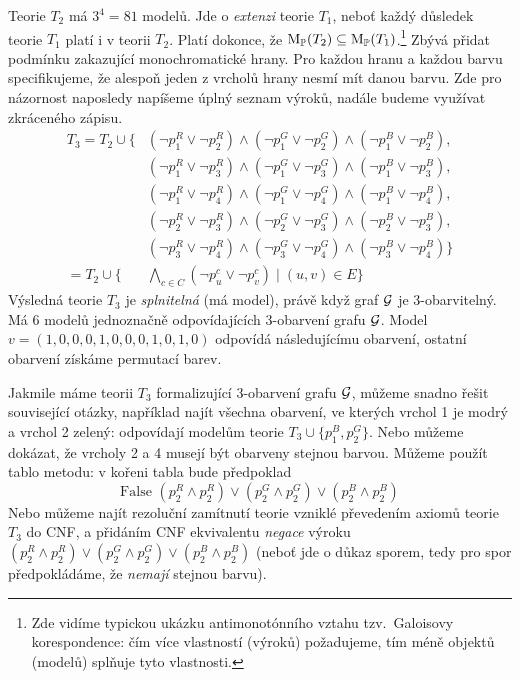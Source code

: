 Teorie \( T_2 \) má \(3^4=81\) modelů. Jde o \emph{extenzi} teorie \( T_1 \), neboť každý důsledek teorie \( T_1 \) platí i v teorii \( T_2 \). Platí dokonce, že \( \operatorname{M}_\mathbb P(T_2)\subseteq\operatorname{M}_\mathbb P(T_1) \).\footnote{Zde vidíme typickou ukázku antimonotónního vztahu tzv.\ Galoisovy korespondence: čím více vlastností (výroků) požadujeme, tím méně objektů (modelů) splňuje tyto vlastnosti.} Zbývá přidat podmínku zakazující monochromatické hrany. Pro každou hranu a každou barvu specifikujeme, že alespoň jeden z vrcholů hrany nesmí mít danou barvu. Zde pro názornost naposledy napíšeme úplný seznam výroků, nadále budeme využívat zkráceného zápisu.
\begin{align*}
    T_3 = T_2\cup \{ & (\neg p_1^R \lor \neg p_2^R) \land (\neg p_1^G \lor \neg p_2^G) \land (\neg p_1^B \lor \neg p_2^B),\\
    & (\neg p_1^R \lor \neg p_3^R) \land (\neg p_1^G \lor \neg p_3^G) \land (\neg p_1^B \lor \neg p_3^B),\\
    & (\neg p_1^R \lor \neg p_4^R) \land (\neg p_1^G \lor \neg p_4^G) \land (\neg p_1^B \lor \neg p_4^B),\\
    & (\neg p_2^R \lor \neg p_3^R) \land (\neg p_2^G \lor \neg p_3^G) \land (\neg p_2^B \lor \neg p_3^B),\\
    & (\neg p_3^R \lor \neg p_4^R) \land (\neg p_3^G \lor \neg p_4^G) \land (\neg p_3^B \lor \neg p_4^B)\} \\  
= T_2\cup \{ &\bigwedge_{c\in C} 
(\neg p_u^c \lor \neg p_v^c) \mid (u,v) \in E \}
\end{align*}
Výsledná teorie \( T_3 \) je \emph{splnitelná} (má model), právě když graf \( \mathcal{G} \) je 3-obarvitelný. Má 6 modelů jednoznačně odpovídajících 3-obarvení grafu \( \mathcal{G} \). Model \( v = (1,0,0,0,1,0,0,0,1,0,1,0) \) odpovídá následujícímu obarvení, ostatní obarvení získáme permutací barev.
\begin{center}
\end{center}

Jakmile máme teorii \(T_3\) formalizující 3-obarvení grafu \( \mathcal{G} \), můžeme snadno řešit související otázky, například najít všechna obarvení, ve kterých vrchol 1 je modrý a vrchol 2 zelený: odpovídají modelům teorie \( T_3 \cup \{ p_1^B, p_2^G\} \). Nebo můžeme dokázat, že vrcholy 2 a 4 musejí být obarveny stejnou barvou. Můžeme použít tablo metodu: v kořeni tabla bude předpoklad
\[
\text{False  }(p_2^R \land p_2^R)\lor(p_2^G \land p_2^G)\lor(p_2^B \land p_2^B)
\]
Nebo můžeme najít rezoluční zamítnutí teorie vzniklé převedením axiomů teorie \( T_3 \) do CNF, a přidáním CNF ekvivalentu \emph{negace} výroku \( (p_2^R \land p_2^R)\lor(p_2^G \land p_2^G)\lor(p_2^B \land p_2^B) \)	(neboť jde o důkaz sporem, tedy pro spor předpokládáme, že \emph{nemají} stejnou barvu).



